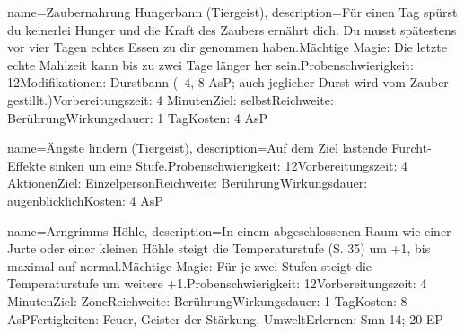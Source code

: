 {
    name={Zaubernahrung Hungerbann (Tiergeist)},
    description={Für einen Tag spürst du keinerlei Hunger und die Kraft des Zaubers ernährt dich. Du musst spätestens vor vier Tagen echtes Essen zu dir genommen haben.\newline Mächtige Magie: Die letzte echte Mahlzeit kann bis zu zwei Tage länger her sein.\newline Probenschwierigkeit: 12\newline Modifikationen: Durstbann (–4, 8 AsP; auch jeglicher Durst wird vom Zauber gestillt.)\newline Vorbereitungszeit: 4 Minuten\newline Ziel: selbst\newline Reichweite: Berührung\newline Wirkungsdauer: 1 Tag\newline Kosten: 4 AsP}
}


{
    name={Ängste lindern (Tiergeist)},
    description={Auf dem Ziel lastende Furcht-Effekte sinken um eine Stufe.\newline Probenschwierigkeit: 12\newline Vorbereitungszeit: 4 Aktionen\newline Ziel: Einzelperson\newline Reichweite: Berührung\newline Wirkungsdauer: augenblicklich\newline Kosten: 4 AsP}
}


{
    name={Arngrimms Höhle},
    description={In einem abgeschlossenen Raum wie einer Jurte oder einer kleinen Höhle steigt die Temperaturstufe (S. 35) um +1, bis maximal auf normal.\newline Mächtige Magie: Für je zwei Stufen steigt die Temperaturstufe um weitere +1.\newline Probenschwierigkeit: 12\newline Vorbereitungszeit: 4 Minuten\newline Ziel: Zone\newline Reichweite: Berührung\newline Wirkungsdauer: 1 Tag\newline Kosten: 8 AsP\newline Fertigkeiten: Feuer, Geister der Stärkung, Umwelt\newline Erlernen: Smn 14; 20 EP}
}


